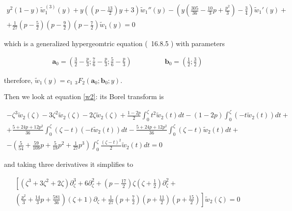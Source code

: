 \documentclass{article}
\theoremstyle{definition}
\begin{document}
\begin{multline}\label{eq:hw1}
y^2(1-y)\tilde{w}_1^{(3)}(y)+y\left((p-\frac{13}{2})y+3\right)\tilde{w}_1''(y)-\left(y\left(\frac{305}{36}-\frac{10}{3}p+\frac{p^2}{3}\right)-\frac{3}{4}\right)\tilde{w}_1'(y)+\\
+\frac{1}{27}\left(p-\frac{5}{2}\right)\left(p-\frac{9}{2}\right)\left(p-\frac{7}{2}\right)\tilde{w}_1(y)=0
\end{multline}

which is a generalized hypergeomtric equation (~16.8.5 \cite{DLMF}) with parameters



\begin{align*}
\mathbf{a}_0=\left(\frac{3}{2}-\frac{p}{3};\frac{7}{6}-\frac{p}{3};\frac{5}{6}-\frac{p}{3}\right) & \qquad\qquad \mathbf{b}_0=\left(\frac{1}{2};\frac{3}{2}\right)
\end{align*}

therefore, $\tilde{w}_1(y)=c_1\,\,{}_3F_2\left(\mathbf{a}_0;\mathbf{b}_0;y\right)$. 

  

Then we look at equation \eqref{w2}: its Borel transform is

\begin{multline}
-\zeta^3\tilde{w}_2(\zeta)-3\zeta^2\tilde{w}_2(\zeta)-2\zeta\tilde{w}_2(\zeta)+\frac{1-2p}{2}\int_0^\zeta t^2\tilde{w}_2(t)dt-(1-2p)\int_0^\zeta(-t\tilde{w}_2(t))dt+\\
+\frac{5+24p+12p^2}{36}\int_0^\zeta(\zeta-t)(-t\tilde{w}_2(t))dt
-\frac{5+24p+12p^2}{36}\int_0^\zeta(\zeta-t)\tilde{w}_2(t)dt +\\
-\left(\frac{5}{54}+\frac{59}{108}p+\frac{5}{18}p^2+\frac{1}{27}p^3\right)\int_0^\zeta\frac{(\zeta-t)^2}{2}\tilde{w}_2(t)dt=0
\end{multline} 

and taking three derivatives it simplifies to 

\begin{multline}
\left[\left(\zeta^3+3\zeta^2+2\zeta\right)\partial_\zeta^3 +6\partial_\zeta^2+\left(p-\frac{17}{2}\right)\zeta\left(\zeta+\frac{1}{2}\right)\partial_\zeta^2+\right.\\
\left. \left(\frac{p^2}{3}+\frac{14}{3}p+\frac{581}{36}\right)\left(\zeta+1\right)\partial_\zeta+\frac{1}{27}\left(p+\frac{7}{2}\right)\left(p+\frac{11}{2}\right)\left(p+\frac{15}{2}\right)\right]\tilde{w}_2(\zeta)=0
\end{multline}
\end{document}
